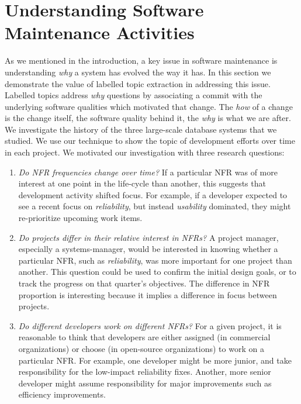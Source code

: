 \documentclass[smallextended]{svjour3}       %
\begin{document}
\section{Understanding Software Maintenance Activities} 
\label{sec:analysis}
As we mentioned in the introduction, a key issue in software
maintenance is understanding \emph{why} a system has evolved the way
it has. 
In this section we demonstrate the value of labelled topic extraction
in addressing this issue. 
Labelled topics address \emph{why} questions by associating a commit with the underlying software qualities which motivated that change.
The \emph{how} of a change is the change itself, the software quality behind it, the
\emph{why} is what we are after.
We investigate the history of the three large-scale database systems that we studied. 
We use our technique to show the topic of development efforts over time in each project.
We motivated our investigation with three research questions:
\renewcommand{\labelenumi}{\textbf{RQ\arabic{enumi}. }}
\begin{enumerate}
\item \emph{Do NFR frequencies change over time?} If a particular NFR
  was of more interest at one point in the life-cycle than another,
  this suggests that development activity shifted focus. For example,
  if a developer expected to see a recent focus on \emph{reliability},
  but instead \emph{usability} dominated, they might re-prioritize
  upcoming work items.

\item \emph{Do projects differ in their relative interest in NFRs?} A
  project manager, especially a systems-manager, would be interested
  in knowing whether a particular NFR, such as \emph{reliability}, was
  more important for one project than another. This question could be used to
  confirm the initial design goals, or to track the progress on that
  quarter's objectives.  The difference in NFR proportion is
  interesting because it implies a difference in focus between projects.

\item \emph{Do different developers work on different NFRs?} For a given project, it is reasonable to think that developers are either assigned
(in commercial organizations) or choose (in open-source organizations) to work on a particular NFR. For example, one developer might be more junior, and take
responsibility for the low-impact reliability fixes. Another, more senior developer might assume responsibility for major improvements such as efficiency
improvements. 

\end{enumerate}
\end{document}
